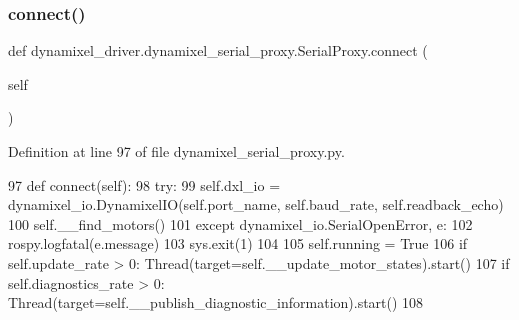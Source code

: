 \mbox{\label{classdynamixel__driver_1_1dynamixel__serial__proxy_1_1_serial_proxy_ac1fd932b790d5188a3f689886838ed5c}} 
\subsubsection{\texorpdfstring{connect()}{connect()}}
{\footnotesize\ttfamily def dynamixel\+\_\+driver.\+dynamixel\+\_\+serial\+\_\+proxy.\+Serial\+Proxy.\+connect (\begin{DoxyParamCaption}\item[{}]{self }\end{DoxyParamCaption})}



Definition at line 97 of file dynamixel\+\_\+serial\+\_\+proxy.\+py.


\begin{DoxyCode}
97     \textcolor{keyword}{def }connect(self):
98         \textcolor{keywordflow}{try}:
99             self.dxl\_io = dynamixel\_io.DynamixelIO(self.port\_name, self.baud\_rate, self.readback\_echo)
100             self.\_\_find\_motors()
101         \textcolor{keywordflow}{except} dynamixel\_io.SerialOpenError, e:
102             rospy.logfatal(e.message)
103             sys.exit(1)
104             
105         self.running = \textcolor{keyword}{True}
106         \textcolor{keywordflow}{if} self.update\_rate > 0: Thread(target=self.\_\_update\_motor\_states).start()
107         \textcolor{keywordflow}{if} self.diagnostics\_rate > 0: Thread(target=self.\_\_publish\_diagnostic\_information).start()
108 
\end{DoxyCode}
\mbox{\label{classdynamixel__driver_1_1dynamixel__serial__proxy_1_1_serial_proxy_a1fd367226e850fe5cd59f901e57ba7de}} 
